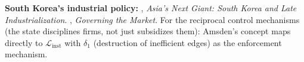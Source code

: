\documentclass[../structural_economics_book.tex]{subfiles}
\begin{document}
\textbf{South Korea's industrial policy:} \citet{amsden1989asia}, \textit{Asia's Next Giant: South Korea and Late Industrialization}. \citet{wade1990governing}, \textit{Governing the Market}. For the reciprocal control mechanisms (the state disciplines firms, not just subsidizes them): Amsden's concept maps directly to $\mathcal{L}_{\text{inst}}$ with $\delta_1$ (destruction of inefficient edges) as the enforcement mechanism.
\end{document}
